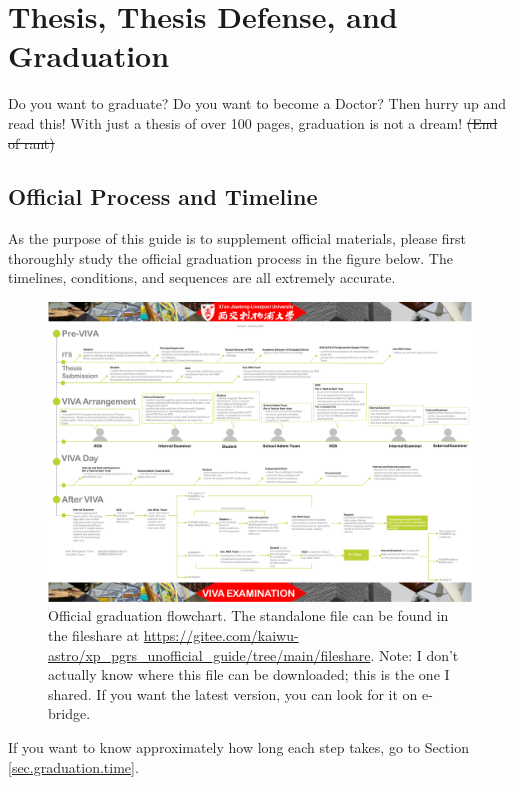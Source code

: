 \section{Thesis, Thesis Defense, and Graduation}
\label{sec.thesis_viva_graduation}

Do you want to graduate? Do you want to become a Doctor? Then hurry up and read this! With just a thesis of over 100 pages, graduation is not a dream! \sout{(End of rant)}

\subsection{Official Process and Timeline}
\label{sec.official.flowchart}

As the purpose of this guide is to supplement official materials, please first thoroughly study the official graduation process in the figure below. The timelines, conditions, and sequences are all extremely accurate.

\begin{figure}[H]
    \centering
    \includegraphics[width=\columnwidth]{fileshare/XJTLU VIVA Examination Arrangement Flowchart_2023.pdf}
    \caption{Official graduation flowchart. The standalone file can be found in the fileshare at \url{https://gitee.com/kaiwu-astro/xp_pgrs_unofficial_guide/tree/main/fileshare}. Note: I don't actually know where this file can be downloaded; this is the one I shared. If you want the latest version, you can look for it on e-bridge.}
\end{figure}

If you want to know approximately how long each step takes, go to Section \ref{sec.graduation.time}.

